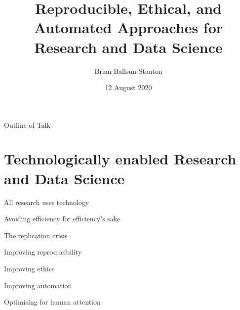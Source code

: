 \documentclass[aspectratio=1610, 11pt]{beamer} %
\title{Reproducible, Ethical, and Automated Approaches for Research and Data Science} %
\author{Brian Ballsun-Stanton}               %
\institute{Faculty of Arts}         %
\date{12 August 2020}                 %
\begin{document}
\maketitle


\begin{frame}{Outline of Talk}
  \tableofcontents
\end{frame}



\section{Technologically enabled Research and Data Science}

\begin{frame}{All research uses technology}
\end{frame}

\begin{frame}{Avoiding efficiency for efficiency's sake}
\end{frame}

\begin{frame}{The replication crisis}
\end{frame}

\begin{frame}{Improving reproducibility}
\end{frame}

\begin{frame}{Improving ethics}
\end{frame}

\begin{frame}{Improving automation}
\end{frame}

\begin{frame}{Optimising for human attention}
\end{frame}
\end{document}
